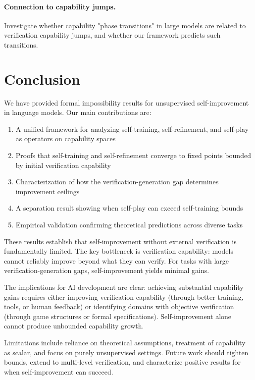 \documentclass{article}
\theoremstyle{definition}
\theoremstyle{remark}
\begin{document}
\paragraph{Connection to capability jumps.} Investigate whether capability "phase transitions" in large models are related to verification capability jumps, and whether our framework predicts such transitions.

\section{Conclusion}
\label{sec:conclusion}

We have provided formal impossibility results for unsupervised self-improvement in language models. Our main contributions are:

\begin{enumerate}
\item A unified framework for analyzing self-training, self-refinement, and self-play as operators on capability spaces
\item Proofs that self-training and self-refinement converge to fixed points bounded by initial verification capability
\item Characterization of how the verification-generation gap determines improvement ceilings
\item A separation result showing when self-play can exceed self-training bounds
\item Empirical validation confirming theoretical predictions across diverse tasks
\end{enumerate}

These results establish that self-improvement without external verification is fundamentally limited. The key bottleneck is verification capability: models cannot reliably improve beyond what they can verify. For tasks with large verification-generation gaps, self-improvement yields minimal gains.

The implications for AI development are clear: achieving substantial capability gains requires either improving verification capability (through better training, tools, or human feedback) or identifying domains with objective verification (through game structures or formal specifications). Self-improvement alone cannot produce unbounded capability growth.

Limitations include reliance on theoretical assumptions, treatment of capability as scalar, and focus on purely unsupervised settings. Future work should tighten bounds, extend to multi-level verification, and characterize positive results for when self-improvement can succeed.
\end{document}
